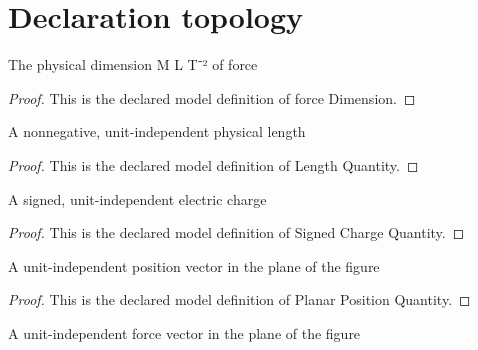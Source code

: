 \section{Declaration topology}
\begin{definition}
  \label{def:physics:phyx-mini-0907:phyxminiproblems-problemphyxmini0907-forcedimension}
  The physical dimension M L T⁻² of force
\end{definition}
\begin{proof}
  This is the declared model definition of force Dimension.
\end{proof}
\begin{definition}
  \label{def:physics:phyx-mini-0907:phyxminiproblems-problemphyxmini0907-lengthquantity}
  A nonnegative, unit-independent physical length
\end{definition}
\begin{proof}
  This is the declared model definition of Length Quantity.
\end{proof}
\begin{definition}
  \label{def:physics:phyx-mini-0907:phyxminiproblems-problemphyxmini0907-signedchargequantity}
  A signed, unit-independent electric charge
\end{definition}
\begin{proof}
  This is the declared model definition of Signed Charge Quantity.
\end{proof}
\begin{definition}
  \label{def:physics:phyx-mini-0907:phyxminiproblems-problemphyxmini0907-planarpositionquantity}
  A unit-independent position vector in the plane of the figure
\end{definition}
\begin{proof}
  This is the declared model definition of Planar Position Quantity.
\end{proof}
\begin{definition}
  \label{def:physics:phyx-mini-0907:phyxminiproblems-problemphyxmini0907-planarforcequantity}
  A unit-independent force vector in the plane of the figure
\end{definition}
